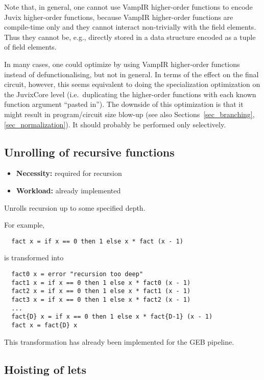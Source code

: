 Note that, in general, one cannot use VampIR higher-order functions to
encode Juvix higher-order functions, because VampIR higher-order
functions are compile-time only and they cannot interact non-trivially
with the field elements. Thus they cannot be, e.g., directly stored in
a data structure encoded as a tuple of field elements.

In many cases, one could optimize by using VampIR higher-order
functions instead of defunctionalising, but not in general. In terms
of the effect on the final circuit, however, this seems equivalent to
doing the specialization optimization on the JuvixCore level
(i.e.~duplicating the higher-order functions with each known function
argument ``pasted in''). The downside of this optimization is that it
might result in program/circuit size blow-up (see also
Sections~\ref{sec_branching},\ref{sec_normalization}). It should
probably be performed only selectively.

\subsection{Unrolling of recursive functions}

\begin{itemize}
\item {\bf Necessity:} required for recursion
\item {\bf Workload:} already implemented
\end{itemize}

\noindent Unrolls recursion up to some specified depth.

\medskip

\noindent For example,
\begin{verbatim}
  fact x = if x == 0 then 1 else x * fact (x - 1)
\end{verbatim}
is transformed into
\begin{verbatim}
  fact0 x = error "recursion too deep"
  fact1 x = if x == 0 then 1 else x * fact0 (x - 1)
  fact2 x = if x == 0 then 1 else x * fact1 (x - 1)
  fact3 x = if x == 0 then 1 else x * fact2 (x - 1)
  ...
  fact{D} x = if x == 0 then 1 else x * fact{D-1} (x - 1)
  fact x = fact{D} x
\end{verbatim}
This transformation has already been implemented for the GEB pipeline.

\subsection{Hoisting of lets}\label{sec_let_hoisting}

